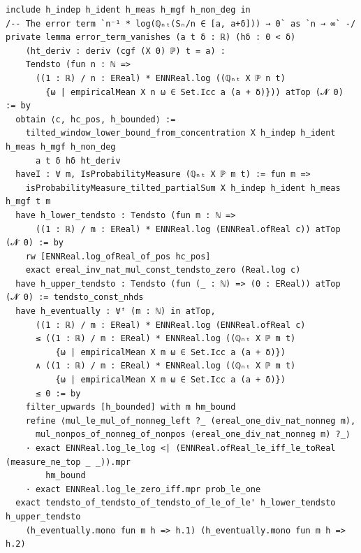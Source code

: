 \begin{lstlisting}
include h_indep h_ident h_meas h_mgf h_non_deg in
/-- The error term `n⁻¹ * log(ℚₙₜ(Sₙ/n ∈ [a, a+δ])) → 0` as `n → ∞` -/
private lemma error_term_vanishes (a t δ : ℝ) (hδ : 0 < δ)
    (ht_deriv : deriv (cgf (X 0) ℙ) t = a) :
    Tendsto (fun n : ℕ =>
      ((1 : ℝ) / n : EReal) * ENNReal.log ((ℚₙₜ X ℙ n t)
        {ω | empiricalMean X n ω ∈ Set.Icc a (a + δ)})) atTop (𝓝 0) := by
  obtain ⟨c, hc_pos, h_bounded⟩ :=
    tilted_window_lower_bound_from_concentration X h_indep h_ident h_meas h_mgf h_non_deg
      a t δ hδ ht_deriv
  haveI : ∀ m, IsProbabilityMeasure (ℚₙₜ X ℙ m t) := fun m =>
    isProbabilityMeasure_tilted_partialSum X h_indep h_ident h_meas h_mgf t m
  have h_lower_tendsto : Tendsto (fun m : ℕ =>
      ((1 : ℝ) / m : EReal) * ENNReal.log (ENNReal.ofReal c)) atTop (𝓝 0) := by
    rw [ENNReal.log_ofReal_of_pos hc_pos]
    exact ereal_inv_nat_mul_const_tendsto_zero (Real.log c)
  have h_upper_tendsto : Tendsto (fun (_ : ℕ) => (0 : EReal)) atTop (𝓝 0) := tendsto_const_nhds
  have h_eventually : ∀ᶠ (m : ℕ) in atTop,
      ((1 : ℝ) / m : EReal) * ENNReal.log (ENNReal.ofReal c)
      ≤ ((1 : ℝ) / m : EReal) * ENNReal.log ((ℚₙₜ X ℙ m t)
          {ω | empiricalMean X m ω ∈ Set.Icc a (a + δ)})
      ∧ ((1 : ℝ) / m : EReal) * ENNReal.log ((ℚₙₜ X ℙ m t)
          {ω | empiricalMean X m ω ∈ Set.Icc a (a + δ)})
      ≤ 0 := by
    filter_upwards [h_bounded] with m hm_bound
    refine ⟨mul_le_mul_of_nonneg_left ?_ (ereal_one_div_nat_nonneg m),
      mul_nonpos_of_nonneg_of_nonpos (ereal_one_div_nat_nonneg m) ?_⟩
    · exact ENNReal.log_le_log <| (ENNReal.ofReal_le_iff_le_toReal (measure_ne_top _ _)).mpr
        hm_bound
    · exact ENNReal.log_le_zero_iff.mpr prob_le_one
  exact tendsto_of_tendsto_of_tendsto_of_le_of_le' h_lower_tendsto h_upper_tendsto
    (h_eventually.mono fun m h => h.1) (h_eventually.mono fun m h => h.2)
\end{lstlisting}
\newpage
